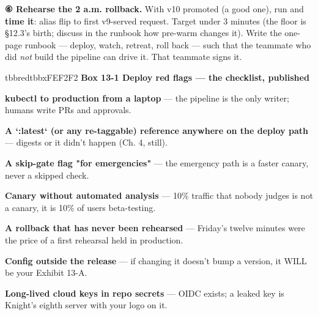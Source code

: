 \begin{tbbitemize}
  \item \textbf{⑥ Rehearse the 2 a.m. rollback.} With v10 promoted (a good one), run  and \textbf{time it}: alias flip to first v9-served request. Target under 3 minutes (the floor is §12.3's birth; discuss in the runbook how pre-warm changes it). Write the one-page runbook — deploy, watch, retreat, roll back — such that the teammate who did \textit{not} build the pipeline can drive it. That teammate signs it.
\end{tbbitemize}

\begin{calloutbox}{tbbred}{tbbxFEF2F2}
{\normalsize\bfseries\color{tbbx991B1B}Box 13-1  Deploy red flags — the checklist, published}\par\vspace{3pt}
\begin{tbbitemize}
  \item \textbf{kubectl to production from a laptop} — the pipeline is the only writer; humans write PRs and approvals.
  \item \textbf{A `:latest` (or any re-taggable) reference anywhere on the deploy path} — digests or it didn't happen (Ch. 4, still).
  \item \textbf{A skip-gate flag "for emergencies"} — the emergency path is a faster canary, never a skipped check.
  \item \textbf{Canary without automated analysis} — 10\% traffic that nobody judges is not a canary, it is 10\% of users beta-testing.
  \item \textbf{A rollback that has never been rehearsed} — Friday's twelve minutes were the price of a first rehearsal held in production.
  \item \textbf{Config outside the release} — if changing it doesn't bump a version, it WILL be your Exhibit 13-A.
  \item \textbf{Long-lived cloud keys in repo secrets} — OIDC exists; a leaked key is Knight's eighth server with your logo on it.
\end{tbbitemize}
\end{calloutbox}

\vspace{3.0pt}


